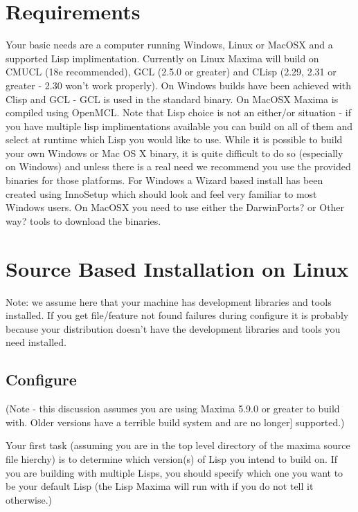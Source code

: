 \section{Requirements}

Your basic needs are a computer running Windows, Linux or MacOSX and a
supported Lisp implimentation.  Currently on Linux Maxima will build on CMUCL (18e 
recommended), GCL (2.5.0 or greater) and CLisp (2.29, 2.31 or greater - 2.30 won't work
properly).  On Windows builds have been achieved with Clisp and GCL - GCL is used
in the standard binary.  On MacOSX Maxima is compiled using OpenMCL. Note that Lisp choice 
is not an either/or situation - if you have
multiple lisp implimentations available you can build on all of them and
select at runtime which Lisp you would like to use.  While it is possible
to build your own Windows or Mac OS X binary, it is quite difficult to do
so (especially on Windows) and unless there is a real need we recommend you
use the provided binaries for those platforms.  For Windows a Wizard based install
has been created using InnoSetup which should look and feel very familiar to most
Windows users.  On MacOSX you need to use either the DarwinPorts? or Other way?
tools to download the binaries.

\section{Source Based Installation on Linux}

Note:  we assume here that your machine has development libraries and tools
installed.  If you get file/feature not found failures during configure it 
is probably because your distribution doesn't have the development libraries
and tools you need installed.


\subsection{Configure}

(Note - this discussion assumes you are using Maxima 5.9.0 or greater to
build with.  Older versions have a terrible build system and are no longer]
supported.)

Your first task (assuming you are in the top level directory of the maxima
source file hierchy) is to determine which version(s) of Lisp you intend to
build on.  If you are building with multiple Lisps, you should specify which
one you want to be your default Lisp (the Lisp Maxima will run with if you do
not tell it otherwise.)

